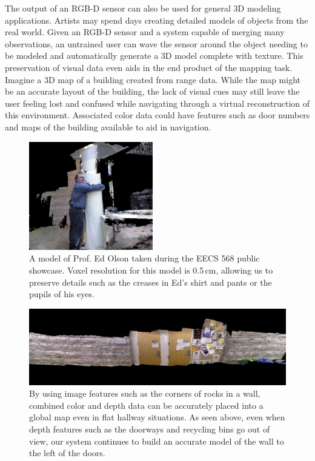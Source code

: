 \documentclass[letterpaper, 10pt, conference]{ieeeconf}
\begin{document}
The output of an RGB-D sensor can also be used for general 3D modeling
applications. Artists may spend days creating detailed models of objects from
the real world. Given an RGB-D sensor and a system capable of merging many
observations, an untrained user can wave the sensor around the object needing
to be modeled and automatically generate a 3D model complete with texture.
This preservation of visual data even aids in the end product of the mapping
task. Imagine a 3D map of a building created from range data. While the map
might be an accurate layout of the building, the lack of visual cues may still
leave the user feeling lost and confused while navigating through a virtual
reconstruction of this environment. Associated color data could
have features such as door numbers and maps of the building available to aid
in navigation.

\begin{figure}[t]
\centering
\includegraphics[width=0.48\textwidth]{figures/cropped_ed.png}
\caption{A model of Prof. Ed Olson taken during the EECS 568 public showcase.
Voxel resolution for this model is 0.5\,cm, allowing us to preserve details
such as the creases in Ed's shirt and pants or the pupils of his eyes.}
\label{fig:ed-model}
\end{figure}

\begin{figure}[t]
\centering
\includegraphics[width=.9\textwidth]{figures/CSE_Wall.png}
\caption{By using image features such as the corners of rocks in a wall,
combined color and depth data can be accurately placed into a global map even
in flat hallway situations. As seen above, even when depth features such as
the doorways and recycling bins go out of view, our system continues to build
an accurate model of the wall to the left of the doors.}
\label{fig:cse-wall}
\end{figure}
\end{document}
